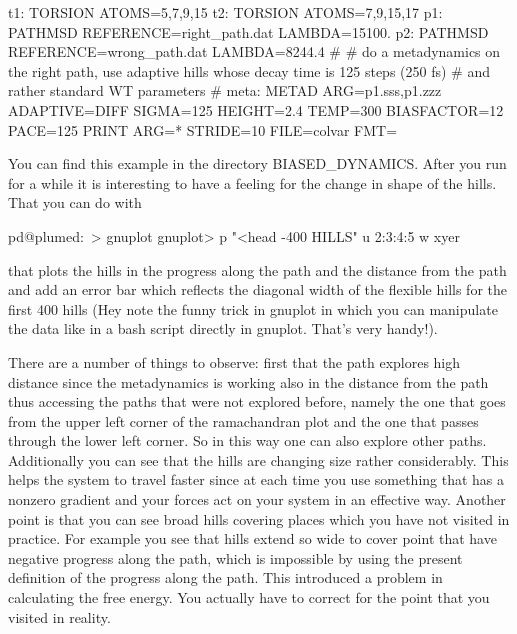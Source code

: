 \begin{DoxyVerb}t1: TORSION ATOMS=5,7,9,15
t2: TORSION ATOMS=7,9,15,17
p1: PATHMSD REFERENCE=right_path.dat LAMBDA=15100.
p2: PATHMSD REFERENCE=wrong_path.dat  LAMBDA=8244.4
#
# do a metadynamics on the right path, use adaptive hills whose decay time is 125 steps (250 fs)
# and rather standard WT parameters
#
meta: METAD ARG=p1.sss,p1.zzz  ADAPTIVE=DIFF SIGMA=125 HEIGHT=2.4 TEMP=300 BIASFACTOR=12 PACE=125
PRINT ARG=* STRIDE=10 FILE=colvar FMT=%
\end{DoxyVerb}


You can find this example in the directory B\+I\+A\+S\+E\+D\+\_\+\+D\+Y\+N\+A\+M\+I\+C\+S. After you run for a while it is interesting to have a feeling for the change in shape of the hills. That you can do with

\begin{DoxyVerb}pd@plumed:~> gnuplot 
gnuplot>  p "<head -400 HILLS" u 2:3:4:5 w xyer 
\end{DoxyVerb}


that plots the hills in the progress along the path and the distance from the path and add an error bar which reflects the diagonal width of the flexible hills for the first 400 hills (Hey note the funny trick in gnuplot in which you can manipulate the data like in a bash script directly in gnuplot. That's very handy!).

\label{belfast-2_belfast-2-metadpath-fig}%
\hypertarget{belfast-2_belfast-2-metadpath-fig}{}%


There are a number of things to observe\+: first that the path explores high distance since the metadynamics is working also in the distance from the path thus accessing the paths that were not explored before, namely the one that goes from the upper left corner of the ramachandran plot and the one that passes through the lower left corner. So in this way one can also explore other paths. Additionally you can see that the hills are changing size rather considerably. This helps the system to travel faster since at each time you use something that has a nonzero gradient and your forces act on your system in an effective way. Another point is that you can see broad hills covering places which you have not visited in practice. For example you see that hills extend so wide to cover point that have negative progress along the path, which is impossible by using the present definition of the progress along the path. This introduced a problem in calculating the free energy. You actually have to correct for the point that you visited in reality.

